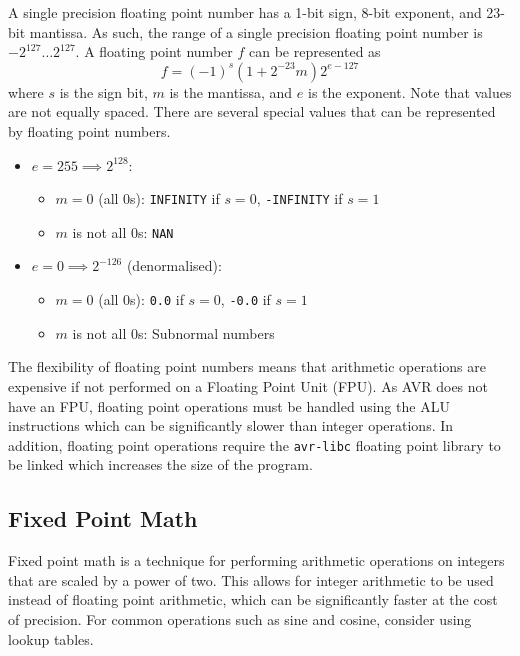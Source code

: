 \documentclass{report}
\begin{document}
A single precision floating point number has a 1-bit sign, 8-bit exponent, and 23-bit mantissa.
As such, the range of a single precision floating point number is \(-2^{127} \ldots 2^{127}\).
A floating point number \(f\) can be represented as
\begin{equation*}
    f = \left( -1 \right)^s \left( 1 + 2^{-23} m \right) 2^{e - 127}
\end{equation*}
where \(s\) is the sign bit, \(m\) is the mantissa, and \(e\) is the exponent.
Note that values are not equally spaced. There are several special values that
can be represented by floating point numbers.
\begin{itemize}
    \item \(e = 255 \implies 2^{128}\):
          \begin{itemize}
              \item \(m = 0\) (all 0s): \texttt{INFINITY} if \(s = 0\), \texttt{-INFINITY} if \(s = 1\)
              \item \(m\) is not all 0s: \texttt{NAN}
          \end{itemize}
    \item \(e = 0 \implies 2^{-126}\) (denormalised):
          \begin{itemize}
              \item \(m = 0\) (all 0s): \texttt{0.0} if \(s = 0\), \texttt{-0.0} if \(s = 1\)
              \item \(m\) is not all 0s: Subnormal numbers
          \end{itemize}
\end{itemize}
The flexibility of floating point numbers means that arithmetic operations
are expensive if not performed on a Floating Point Unit (FPU). As AVR does not have an FPU, floating point operations
must be handled using the ALU instructions which can be significantly slower than integer \linebreak operations.
In addition, floating point operations require the \texttt{avr-libc} floating point library to be linked
which increases the size of the program.
\subsection{Fixed Point Math}
Fixed point math is a technique for performing arithmetic operations on integers
that are scaled by a power of two. This allows for integer arithmetic to be used
instead of floating point arithmetic, which can be significantly faster
at the cost of precision.
For common operations such as sine and cosine, consider using lookup tables.
\end{document}
